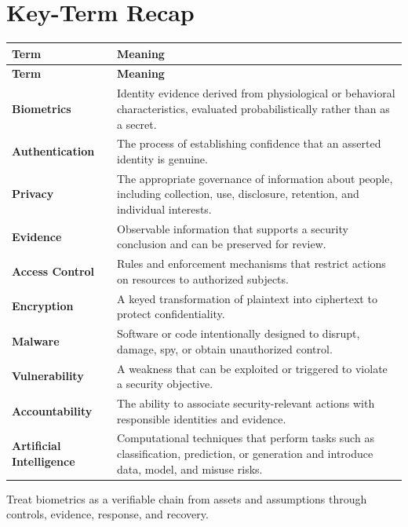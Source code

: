 \documentclass[11pt]{article}
\begin{document}
\section*{Key-Term Recap}
\begin{longtable}{>{\RaggedRight\arraybackslash}p{}>{\RaggedRight\arraybackslash}p{}}
\toprule\rowcolor{Navy}\color{white}\textbf{Term} & \color{white}\textbf{Meaning}\\\midrule
\endfirsthead
\toprule\rowcolor{Navy}\color{white}\textbf{Term} & \color{white}\textbf{Meaning}\\\midrule
\endhead
\textbf{Biometrics} & Identity evidence derived from physiological or behavioral characteristics, evaluated probabilistically rather than as a secret. \\\midrule
\textbf{Authentication} & The process of establishing confidence that an asserted identity is genuine. \\\midrule
\textbf{Privacy} & The appropriate governance of information about people, including collection, use, disclosure, retention, and individual interests. \\\midrule
\textbf{Evidence} & Observable information that supports a security conclusion and can be preserved for review. \\\midrule
\textbf{Access Control} & Rules and enforcement mechanisms that restrict actions on resources to authorized subjects. \\\midrule
\textbf{Encryption} & A keyed transformation of plaintext into ciphertext to protect confidentiality. \\\midrule
\textbf{Malware} & Software or code intentionally designed to disrupt, damage, spy, or obtain unauthorized control. \\\midrule
\textbf{Vulnerability} & A weakness that can be exploited or triggered to violate a security objective. \\\midrule
\textbf{Accountability} & The ability to associate security-relevant actions with responsible identities and evidence. \\\midrule
\textbf{Artificial Intelligence} & Computational techniques that perform tasks such as classification, prediction, or generation and introduce data, model, and misuse risks. \\\midrule
\bottomrule
\end{longtable}
\begin{takeawaybox}
Treat biometrics as a verifiable chain from assets and assumptions through controls, evidence, response, and recovery.
\end{takeawaybox}
\end{document}
